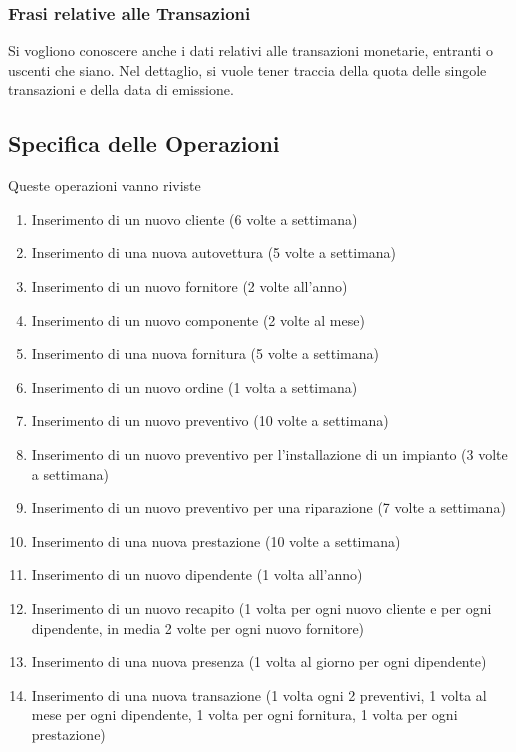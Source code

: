 		\subsubsection{Frasi relative alle Transazioni}
		
			Si vogliono conoscere anche i dati relativi alle transazioni monetarie, entranti o uscenti che siano. Nel dettaglio, si vuole tener traccia della quota delle singole transazioni e della data di emissione.
			
	\subsection{Specifica delle Operazioni}
		
		Queste operazioni vanno riviste
	
		\begin{enumerate}
			
			\item Inserimento di un nuovo cliente (6 volte a settimana)
			\item Inserimento di una nuova autovettura (5 volte a settimana)
			\item Inserimento di un nuovo fornitore (2 volte all’anno)
			\item Inserimento di un nuovo componente (2 volte al mese)
			\item Inserimento di una nuova fornitura (5 volte a settimana)
			\item Inserimento di un nuovo ordine (1 volta a settimana)
			\item Inserimento di un nuovo preventivo (10 volte a settimana)
			\item Inserimento di un nuovo preventivo per l’installazione di un impianto (3 volte a settimana)
			\item Inserimento di un nuovo preventivo per una riparazione (7 volte a settimana)
			\item Inserimento di una nuova prestazione (10 volte a settimana)
			\item Inserimento di un nuovo dipendente (1 volta all’anno)
			\item Inserimento di un nuovo recapito (1 volta per ogni nuovo cliente e per ogni dipendente, in media 2 volte per ogni nuovo fornitore)
			\item Inserimento di una nuova presenza (1 volta al giorno per ogni dipendente)
			\item Inserimento di una nuova transazione (1 volta ogni 2 preventivi, 1 volta al mese per ogni dipendente, 1 volta per ogni fornitura, 1 volta per ogni prestazione)
			

\end{enumerate}
